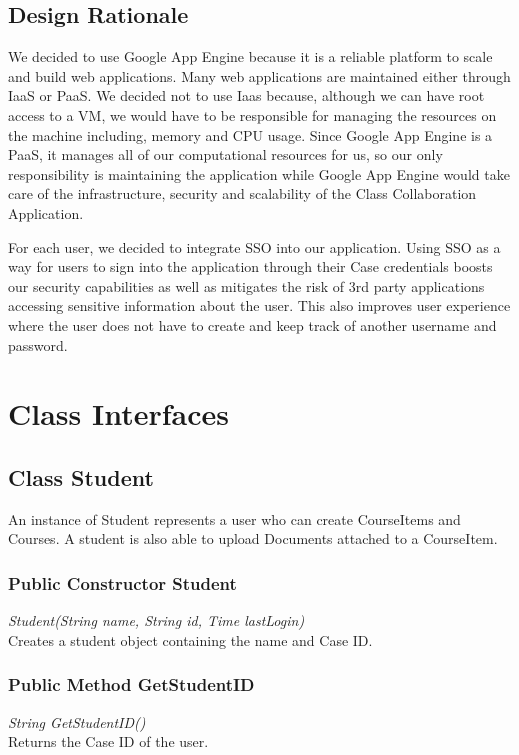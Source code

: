 \documentclass{scrreprt}
\begin{document}
\section{Design Rationale}
\hspace{10mm}We decided to use Google App Engine because it is a reliable platform to scale and build web applications. Many web applications are maintained either through IaaS or PaaS. We decided not to use Iaas because, although we can have root access to a VM, we would have to be responsible for managing the resources on the machine including, memory and CPU usage. Since Google App Engine is a PaaS, it manages all of our computational resources for us, so our only responsibility is maintaining the application while Google App Engine would take care of the infrastructure, security and scalability of the Class Collaboration Application. 

\hspace{10mm}For each user, we decided to integrate SSO into our application. Using SSO as a way for users to sign into the application through their Case credentials boosts our security capabilities as well as mitigates the risk of 3rd party applications accessing sensitive information about the user. This also improves user experience where the user does not have to create and keep track of another username and password. 



\chapter{Class Interfaces}

\section{Class Student}
An instance of Student represents a user who can create CourseItems and 		Courses. A student is also able to upload Documents attached to a CourseItem.

\subsection{Public Constructor Student}
\textit{Student(String name, String id, Time lastLogin)} \\
Creates a student object containing the name and Case ID.

\subsection{Public Method GetStudentID}
\textit{String GetStudentID()} \\
Returns the Case ID of the user.
\end{document}
